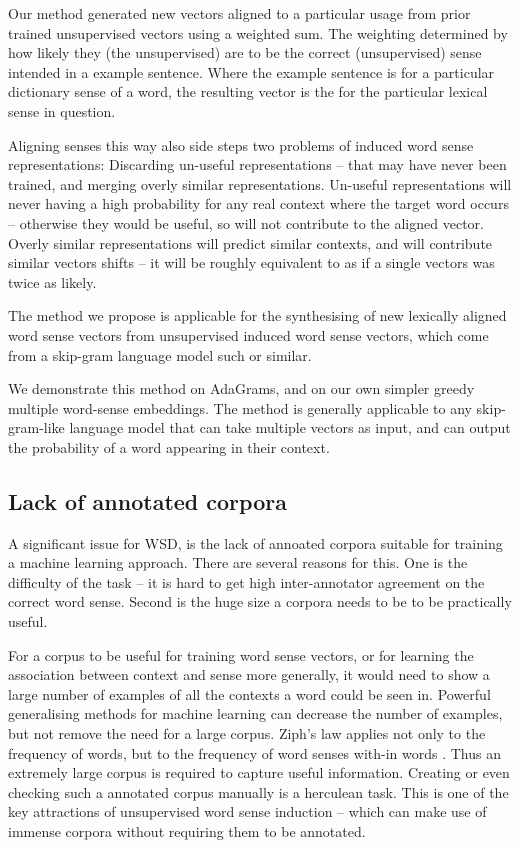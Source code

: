 \documentclass{sig-alternate}
\begin{document}
Our method generated new vectors aligned to a particular usage from prior trained unsupervised vectors using a weighted sum. The weighting determined by how likely they (the unsupervised) are to be the correct (unsupervised) sense intended in a example sentence. Where the example sentence is for a particular dictionary sense of a word, the resulting vector is the for the particular lexical sense in question.

Aligning senses this way also side steps two problems of induced word sense representations: Discarding un-useful representations -- that may have never been trained, and merging overly similar representations. Un-useful representations will never having a high probability for any real context where the target word occurs -- otherwise they would be useful, so will not contribute to the aligned vector. Overly similar representations will  predict similar contexts, and will contribute similar vectors shifts -- it will be roughly equivalent to as if a single vectors was twice as likely.


The method we propose is applicable for the synthesising of new lexically aligned word sense vectors from unsupervised induced word sense vectors, which come from a skip-gram language model such or similar.



We demonstrate this method on AdaGrams\parencite{AdaGrams}, and on our own simpler greedy multiple word-sense embeddings. The method is generally applicable to any skip-gram-like language model that can take multiple vectors as input, and can output the probability of a word appearing in their context.

\subsection{Lack of annotated corpora} \label{corpussize}
A significant issue for WSD, is the lack of annoated corpora suitable for training a machine learning approach.
There are several reasons for this. One is the difficulty of the task -- it is hard to get high inter-annotator agreement on the correct word sense. Second is the huge size a corpora needs to be to be practically useful.

For a corpus to be useful for training word sense vectors, or for learning the association between context and sense more generally, it would need to show a large number of examples of all the contexts a word could be seen in. Powerful generalising methods for machine learning can decrease the number of examples, but not remove the need for a large corpus. Ziph's law applies not only to the frequency of words, but to the frequency of word senses with-in words . Thus an extremely large corpus is required to capture useful information. Creating or even checking such a annotated corpus manually is a herculean task. This is one of the key attractions of unsupervised word sense induction -- which can make use of immense corpora without requiring them to be annotated.
\end{document}
